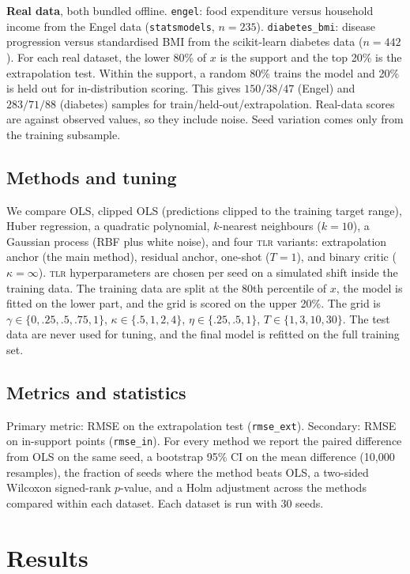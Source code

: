 \documentclass[10pt]{article}
\newcommand{\TLR}{\textsc{tlr}}
\begin{document}
\textbf{Real data}, both bundled offline. \texttt{engel}: food expenditure versus household income from the Engel data (\texttt{statsmodels}, $n=235$). \texttt{diabetes\_bmi}: disease progression versus standardised BMI from the scikit-learn diabetes data ($n=442$). For each real dataset, the lower 80\% of $x$ is the support and the top 20\% is the extrapolation test. Within the support, a random 80\% trains the model and 20\% is held out for in-distribution scoring. This gives $150/38/47$ (Engel) and $283/71/88$ (diabetes) samples for train/held-out/extrapolation. Real-data scores are against observed values, so they include noise. Seed variation comes only from the training subsample.

\subsection{Methods and tuning}
We compare OLS, clipped OLS (predictions clipped to the training target range), Huber regression, a quadratic polynomial, $k$-nearest neighbours ($k=10$), a Gaussian process (RBF plus white noise), and four \TLR{} variants: extrapolation anchor (the main method), residual anchor, one-shot ($T=1$), and binary critic ($\kappa=\infty$). \TLR{} hyperparameters are chosen per seed on a simulated shift inside the training data. The training data are split at the 80th percentile of $x$, the model is fitted on the lower part, and the grid is scored on the upper 20\%. The grid is $\gamma\in\{0,.25,.5,.75,1\}$, $\kappa\in\{.5,1,2,4\}$, $\eta\in\{.25,.5,1\}$, $T\in\{1,3,10,30\}$. The test data are never used for tuning, and the final model is refitted on the full training set.

\subsection{Metrics and statistics}
Primary metric: RMSE on the extrapolation test (\texttt{rmse\_ext}). Secondary: RMSE on in-support points (\texttt{rmse\_in}). For every method we report the paired difference from OLS on the same seed, a bootstrap 95\% CI on the mean difference (10{,}000 resamples), the fraction of seeds where the method beats OLS, a two-sided Wilcoxon signed-rank $p$-value, and a Holm adjustment across the methods compared within each dataset. Each dataset is run with 30 seeds.

\section{Results}
\end{document}
